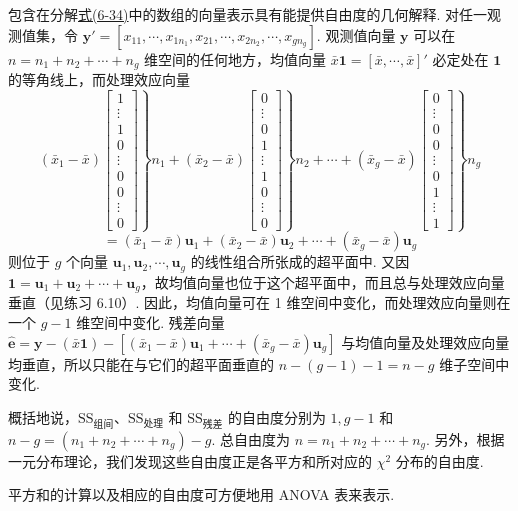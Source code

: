 包含在分解\hyperref[eq:6-34]{式(6-34)}中的数组的向量表示具有能提供自由度的几何解释. 对任一观测值集，令 $\mathbf{y}'=[x_{11},\cdots,x_{1n_1},x_{21},\cdots,x_{2n_2},\cdots,x_{gn_g}]$. 观测值向量 $\mathbf{y}$ 可以在 $n=n_1+n_2+\cdots+n_g$ 维空间的任何地方，均值向量 $\bar{x}\mathbf{1}=[\bar{x},\cdots,\bar{x}]'$ 必定处在 $\mathbf{1}$ 的等角线上，而处理效应向量
\[
(\bar{x}_1-\bar{x})\left.\begin{bmatrix}1\\\vdots\\1\\0\\\vdots\\0\\0\\\vdots\\0\end{bmatrix}\right\}n_1
+(\bar{x}_2-\bar{x})\left.\begin{bmatrix}0\\\vdots\\0\\1\\\vdots\\1\\0\\\vdots\\0\end{bmatrix}\right\}n_2
+\cdots+(\bar{x}_g-\bar{x})\left.\begin{bmatrix}0\\\vdots\\0\\0\\\vdots\\0\\1\\\vdots\\1\end{bmatrix}\right\}n_g
\]
\[
=(\bar{x}_1-\bar{x})\mathbf{u}_1+(\bar{x}_2-\bar{x})\mathbf{u}_2+\cdots+(\bar{x}_g-\bar{x})\mathbf{u}_g
\]
则位于 $g$ 个向量 $\mathbf{u}_1,\mathbf{u}_2,\cdots,\mathbf{u}_g$ 的线性组合所张成的超平面中. 又因 $\mathbf{1}=\mathbf{u}_1+\mathbf{u}_2+\cdots+\mathbf{u}_g$，故均值向量也位于这个超平面中，而且总与处理效应向量垂直（见练习 6.10）. 因此，均值向量可在 1 维空间中变化，而处理效应向量则在一个 $g-1$ 维空间中变化. 残差向量 $\hat{\mathbf{e}}=\mathbf{y}-(\bar{x}\mathbf{1})-[(\bar{x}_1-\bar{x})\mathbf{u}_1+\cdots+(\bar{x}_g-\bar{x})\mathbf{u}_g]$ 与均值向量及处理效应向量均垂直，所以只能在与它们的超平面垂直的 $n-(g-1)-1=n-g$ 维子空间中变化.

概括地说，$\mathrm{SS}_{\text{组间}}$、$\mathrm{SS}_{\text{处理}}$ 和 $\mathrm{SS}_{\text{残差}}$ 的自由度分别为 $1,g-1$ 和 $n-g=(n_1+n_2+\cdots+n_g)-g$. 总自由度为 $n=n_1+n_2+\cdots+n_g$. 另外，根据一元分布理论，我们发现这些自由度正是各平方和所对应的 $\chi^2$ 分布的自由度.

平方和的计算以及相应的自由度可方便地用 ANOVA 表来表示.
